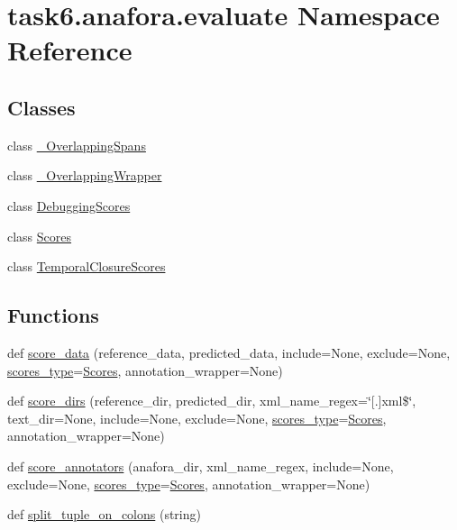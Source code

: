 \hypertarget{namespacetask6_1_1anafora_1_1evaluate}{}\section{task6.\+anafora.\+evaluate Namespace Reference}
\label{namespacetask6_1_1anafora_1_1evaluate}
\subsection*{Classes}
\begin{DoxyCompactItemize}
\item 
class \hyperlink{classtask6_1_1anafora_1_1evaluate_1_1__OverlappingSpans}{\+\_\+\+Overlapping\+Spans}
\item 
class \hyperlink{classtask6_1_1anafora_1_1evaluate_1_1__OverlappingWrapper}{\+\_\+\+Overlapping\+Wrapper}
\item 
class \hyperlink{classtask6_1_1anafora_1_1evaluate_1_1DebuggingScores}{Debugging\+Scores}
\item 
class \hyperlink{classtask6_1_1anafora_1_1evaluate_1_1Scores}{Scores}
\item 
class \hyperlink{classtask6_1_1anafora_1_1evaluate_1_1TemporalClosureScores}{Temporal\+Closure\+Scores}
\end{DoxyCompactItemize}
\subsection*{Functions}
\begin{DoxyCompactItemize}
\item 
def \hyperlink{namespacetask6_1_1anafora_1_1evaluate_a67ad3f84f7848ed120379ec92f0dfa26}{score\+\_\+data} (reference\+\_\+data, predicted\+\_\+data, include=None, exclude=None, \hyperlink{namespacetask6_1_1anafora_1_1evaluate_aa641ae042502a113c0f501f5df0975a6}{scores\+\_\+type}=\hyperlink{classtask6_1_1anafora_1_1evaluate_1_1Scores}{Scores}, annotation\+\_\+wrapper=None)
\item 
def \hyperlink{namespacetask6_1_1anafora_1_1evaluate_ae1fc8e22a0673934451d3e0cb8972f56}{score\+\_\+dirs} (reference\+\_\+dir, predicted\+\_\+dir, xml\+\_\+name\+\_\+regex=\char`\"{}\mbox{[}.\mbox{]}xml\$\char`\"{}, text\+\_\+dir=None, include=None, exclude=None, \hyperlink{namespacetask6_1_1anafora_1_1evaluate_aa641ae042502a113c0f501f5df0975a6}{scores\+\_\+type}=\hyperlink{classtask6_1_1anafora_1_1evaluate_1_1Scores}{Scores}, annotation\+\_\+wrapper=None)
\item 
def \hyperlink{namespacetask6_1_1anafora_1_1evaluate_a2622d41ca15c96f378cc2359f60a377c}{score\+\_\+annotators} (anafora\+\_\+dir, xml\+\_\+name\+\_\+regex, include=None, exclude=None, \hyperlink{namespacetask6_1_1anafora_1_1evaluate_aa641ae042502a113c0f501f5df0975a6}{scores\+\_\+type}=\hyperlink{classtask6_1_1anafora_1_1evaluate_1_1Scores}{Scores}, annotation\+\_\+wrapper=None)
\item 
def \hyperlink{namespacetask6_1_1anafora_1_1evaluate_aad7a5a4b937cb2a4a31b4ce68b1b517e}{split\+\_\+tuple\+\_\+on\+\_\+colons} (string)
\end{DoxyCompactItemize}
